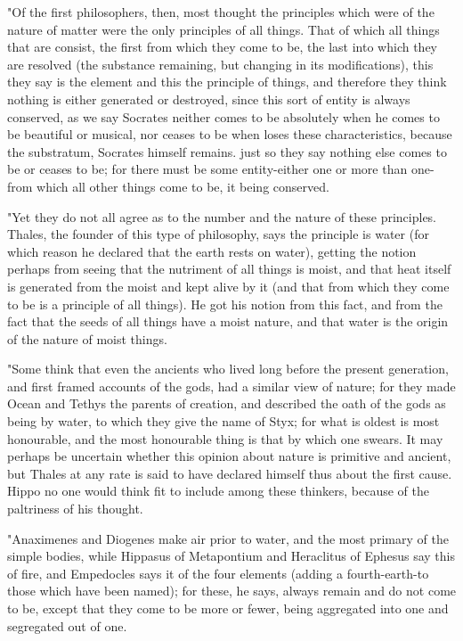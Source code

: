 "Of the first philosophers, then, most thought the principles which
were of the nature of matter were the only principles of all things.
That of which all things that are consist, the first from which they
come to be, the last into which they are resolved (the substance remaining,
but changing in its modifications), this they say is the element and
this the principle of things, and therefore they think nothing is
either generated or destroyed, since this sort of entity is always
conserved, as we say Socrates neither comes to be absolutely when
he comes to be beautiful or musical, nor ceases to be when loses these
characteristics, because the substratum, Socrates himself remains.
just so they say nothing else comes to be or ceases to be; for there
must be some entity-either one or more than one-from which all other
things come to be, it being conserved. 

"Yet they do not all agree as to the number and the nature of these
principles. Thales, the founder of this type of philosophy, says the
principle is water (for which reason he declared that the earth rests
on water), getting the notion perhaps from seeing that the nutriment
of all things is moist, and that heat itself is generated from the
moist and kept alive by it (and that from which they come to be is
a principle of all things). He got his notion from this fact, and
from the fact that the seeds of all things have a moist nature, and
that water is the origin of the nature of moist things. 

"Some think that even the ancients who lived long before the present
generation, and first framed accounts of the gods, had a similar view
of nature; for they made Ocean and Tethys the parents of creation,
and described the oath of the gods as being by water, to which they
give the name of Styx; for what is oldest is most honourable, and
the most honourable thing is that by which one swears. It may perhaps
be uncertain whether this opinion about nature is primitive and ancient,
but Thales at any rate is said to have declared himself thus about
the first cause. Hippo no one would think fit to include among these
thinkers, because of the paltriness of his thought. 

"Anaximenes and Diogenes make air prior to water, and the most primary
of the simple bodies, while Hippasus of Metapontium and Heraclitus
of Ephesus say this of fire, and Empedocles says it of the four elements
(adding a fourth-earth-to those which have been named); for these,
he says, always remain and do not come to be, except that they come
to be more or fewer, being aggregated into one and segregated out
of one. 


